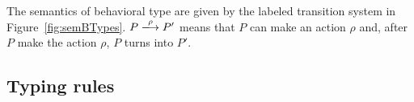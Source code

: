 
The semantics of behavioral type are given by the labeled transition
system in Figure~\ref{fig:semBTypes}.  \(P \xlongrightarrow{\rho} P'\)
means that \(P\) can make an action \(\rho\) and, after \(P\) make the
action \(\rho\), \(P\) turns into \(P'\).



\subsection{Typing rules}


